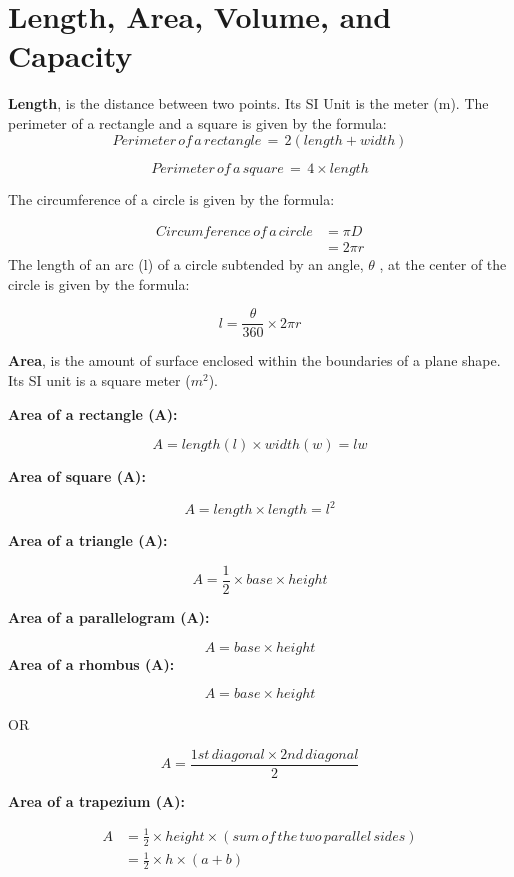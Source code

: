 \documentclass[
  a4paperpaper,
]{scrbook}
\begin{document}

\hypertarget{length-area-volume-and-capacity}{%
\chapter*{Length, Area, Volume, and
Capacity}\label{length-area-volume-and-capacity}}


\textbf{Length}, is the distance between two points. Its SI Unit is the
meter (m). The perimeter of a rectangle and a square is given by the
formula: \[ Perimeter\, of \,a \,rectangle\,=\,2(length+width)\]

\[Perimeter \,of \,a \,square\,=\,4 \times length\]

The circumference of a circle is given by the formula:

\[
\begin{align*}
Circumference \,of\, a \,circle &=\pi D\\&=2\pi r
\end{align*} 
\] The length of an arc (l) of a circle subtended by an angle,
\(\theta\) , at the center of the circle is given by the formula:

\[ l=\frac{\theta}{360}\times 2\pi r\]

\textbf{Area}, is the amount of surface enclosed within the boundaries
of a plane shape. Its SI unit is a square meter (\(m^2\)).

\textbf{Area of a rectangle (A):}

\[A=length (l)\times width(w)=lw\]

\textbf{Area of square (A):}

\[A=length \times length= l^2\]

\textbf{Area of a triangle (A): }

\[A=\frac{1}{2} \times base \times height\]

\textbf{Area of a parallelogram (A):}

\[A=base \times height\] \textbf{Area of a rhombus (A):}

\[A=base \times height   \]

OR

\[A=\frac{1st\, diagonal \times 2nd \,diagonal}{2}\]

\textbf{Area of a trapezium  (A):}

\[
\begin{align*}
A&=\frac{1}{2} \times height\times (sum \,of \,the\, two \,parallel \,sides)\\
&=\frac{1}{2} \times h \times (a+b)
\end{align*}
\]
\end{document}
